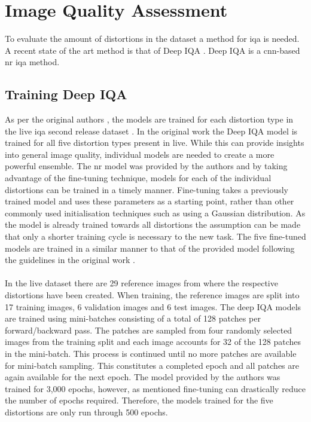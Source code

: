 \section{Image Quality Assessment}
To evaluate the amount of distortions in the dataset a method for \gls{iqa} is needed. A recent state of the art method is that of Deep IQA \cite{deepiqa}. Deep IQA is a \gls{cnn}-based \gls{nr} \gls{iqa} method.

\subsection{Training Deep IQA}
As per the original authors \cite{deepiqa}, the models are trained for each distortion type in the \gls{live} \gls{iqa} second release dataset \cite{livepaper} \cite{liveweb}. In the original work the Deep IQA model is trained for all five distortion types present in \gls{live}. While this can provide insights into general image quality, individual models are needed to create a more powerful ensemble. The \gls{nr} model was provided by the authors and by taking advantage of the fine-tuning technique, models for each of the individual distortions can be trained in a timely manner. Fine-tuning takes a previously trained model and uses these parameters as a starting point, rather than other commonly used initialisation techniques such as using a Gaussian distribution. As the model is already trained towards all distortions the assumption can be made that only a shorter training cycle is necessary to the new task. The five fine-tuned models are trained in a similar manner to that of the provided model following the guidelines in the original work \cite{deepiqa}. 
\\\\
In the \gls{live} dataset there are 29 reference images from where the respective distortions have been created. When training, the reference images are split into 17 training images, 6 validation images and 6 test images. The deep IQA models are trained using mini-batches consisting of a total of 128 patches per forward/backward pass. The patches are sampled from four randomly selected images from the training split and each image accounts for 32 of the 128 patches in the mini-batch. This process is continued until no more patches are available for mini-batch sampling. This constitutes a completed epoch and all patches are again available for the next epoch. The model provided by the authors was trained for 3,000 epochs, however, as mentioned fine-tuning can drastically reduce the number of epochs required. Therefore, the models trained for the five distortions are only run through 500 epochs. 


